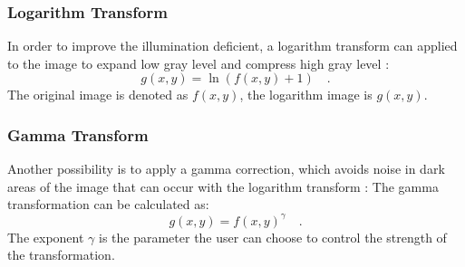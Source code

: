 \subsubsection{Logarithm Transform}
In order to improve the illumination deficient, a logarithm transform can applied to the image
to expand low gray level and compress high gray level \cite{liu02}:
\begin{equation}
g(x,y)= \ln(f(x,y)+1) \quad .
\end{equation}
The original image is denoted as $f(x,y)$, the logarithm image is $g(x,y)$.

\subsubsection{Gamma Transform}
\todo{}
Another possibility is to apply a gamma correction, which avoids noise in dark areas of the image that can occur with the logarithm transform \cite{Tan2010}:
The gamma transformation can be calculated as:
\begin{equation}
	g(x,y)= f(x,y)^\gamma \label{eqn:gamma} \quad .
\end{equation}
The exponent $\gamma$ is the parameter the user can choose to control the strength of the transformation.


